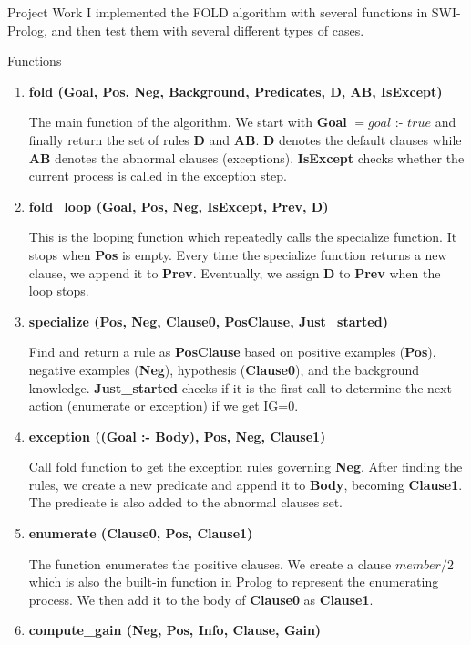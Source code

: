\documentclass[12pt,a4paper]{article}
\begin{document}
	\begin{section}{Project Work}
		I implemented the FOLD algorithm with several functions in SWI-Prolog, and then test them 
		with several different types of cases.
		\begin{subsection}{Functions}
			\begin{enumerate}
				\item {
					{\bf fold (Goal, Pos, Neg, Background, Predicates, D, AB, IsExcept)}

					The main function of the algorithm. We start with {\bf Goal} $=goal\text{ :- }true$ and finally return the set of rules {\bf D} and {\bf AB}. {\bf D} denotes the default clauses while {\bf AB} denotes the abnormal clauses (exceptions). {\bf IsExcept} checks whether the current process is called in the exception step.

				}
				\item {
					{\bf fold\_loop (Goal, Pos, Neg, IsExcept, Prev, D)}

					This is the looping function which repeatedly calls the specialize function. It stops when {\bf Pos} is empty. Every time the specialize function returns a new clause, we append it to {\bf Prev}. Eventually, we assign {\bf D} to {\bf Prev} when the loop stops.
				}
				\item {
					{\bf specialize (Pos, Neg, Clause0, PosClause, Just\_started)}

					Find and return a rule as {\bf PosClause} based on positive examples ({\bf Pos}), negative examples ({\bf Neg}), hypothesis ({\bf Clause0}), and the background knowledge. {\bf Just\_started} checks if it is the first call to determine the next action (enumerate or exception) if we get IG=0.
				}
				\item {
					{\bf exception ((Goal :- Body), Pos, Neg, Clause1)}

					Call fold function to get the exception rules governing {\bf Neg}. After finding the rules, we create a new predicate and append it to {\bf Body}, becoming {\bf Clause1}. The predicate is also added to the abnormal clauses set.
				}
				\item {
					{\bf enumerate (Clause0, Pos, Clause1)}

					The function enumerates the positive clauses. We create a clause $member/2$ which is also the built-in function in Prolog to represent the enumerating process. We then add it to the body of {\bf Clause0} as {\bf Clause1}.
				}
				\item {
					{\bf compute\_gain (Neg, Pos, Info, Clause, Gain)}

}
\end{enumerate}
\end{subsection}
\end{section}
\end{document}
